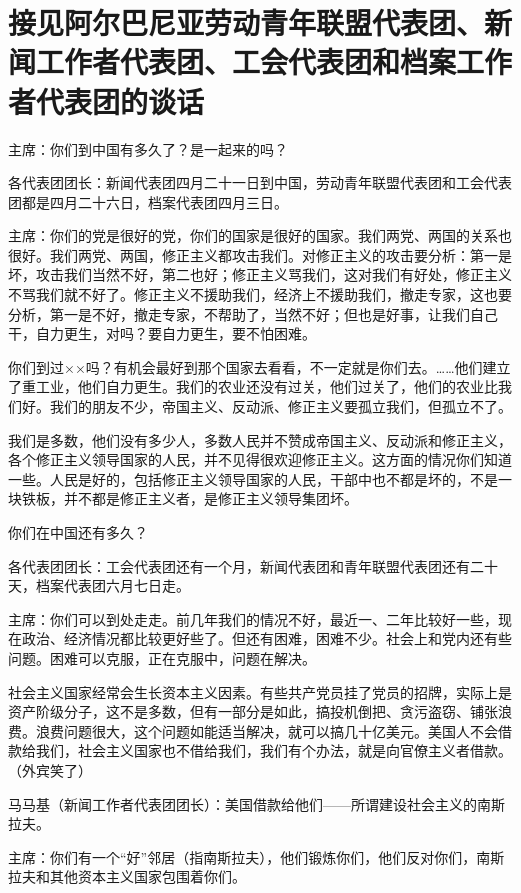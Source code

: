 \section[接见阿尔巴尼亚劳动青年联盟代表团、新闻工作者代表团、工会代表团和档案工作者代表团的谈话（一九六三年五月四日）]{接见阿尔巴尼亚劳动青年联盟代表团、新闻工作者代表团、工会代表团和档案工作者代表团的谈话}


主席：你们到中国有多久了？是一起来的吗？

各代表团团长：新闻代表团四月二十一日到中国，劳动青年联盟代表团和工会代表团都是四月二十六日，档案代表团四月三日。

主席：你们的党是很好的党，你们的国家是很好的国家。我们两党、两国的关系也很好。我们两党、两国，修正主义都攻击我们。对修正主义的攻击要分析：第一是坏，攻击我们当然不好，第二也好；修正主义骂我们，这对我们有好处，修正主义不骂我们就不好了。修正主义不援助我们，经济上不援助我们，撤走专家，这也要分析，第一是不好，撤走专家，不帮助了，当然不好；但也是好事，让我们自己干，自力更生，对吗？要自力更生，要不怕困难。

你们到过××吗？有机会最好到那个国家去看看，不一定就是你们去。……他们建立了重工业，他们自力更生。我们的农业还没有过关，他们过关了，他们的农业比我们好。我们的朋友不少，帝国主义、反动派、修正主义要孤立我们，但孤立不了。

我们是多数，他们没有多少人，多数人民并不赞成帝国主义、反动派和修正主义，各个修正主义领导国家的人民，并不见得很欢迎修正主义。这方面的情况你们知道一些。人民是好的，包括修正主义领导国家的人民，干部中也不都是坏的，不是一块铁板，并不都是修正主义者，是修正主义领导集团坏。

你们在中国还有多久？

各代表团团长：工会代表团还有一个月，新闻代表团和青年联盟代表团还有二十天，档案代表团六月七日走。

主席：你们可以到处走走。前几年我们的情况不好，最近一、二年比较好一些，现在政治、经济情况都比较更好些了。但还有困难，困难不少。社会上和党内还有些问题。困难可以克服，正在克服中，问题在解决。

社会主义国家经常会生长资本主义因素。有些共产党员挂了党员的招牌，实际上是资产阶级分子，这不是多数，但有一部分是如此，搞投机倒把、贪污盗窃、铺张浪费。浪费问题很大，这个问题如能适当解决，就可以搞几十亿美元。美国人不会借款给我们，社会主义国家也不借给我们，我们有个办法，就是向官僚主义者借款。（外宾笑了）

马马基（新闻工作者代表团团长）：美国借款给他们——所谓建设社会主义的南斯拉夫。

主席：你们有一个“好”邻居（指南斯拉夫），他们锻炼你们，他们反对你们，南斯拉夫和其他资本主义国家包围着你们。

